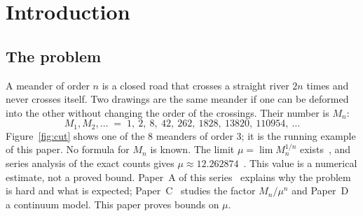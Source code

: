 \section{Introduction}\label{sec:intro}

\subsection{The problem}

A meander of order $n$ is a closed road that crosses a straight river $2n$ times and never crosses itself. Two drawings
are the same meander if one can be deformed into the other without changing the order of the crossings. Their number
is $M_n$:
\[ M_1, M_2, \ldots \;=\; 1,\ 2,\ 8,\ 42,\ 262,\ 1828,\ 13820,\ 110954,\ \ldots \]
Figure~\ref{fig:cut} shows one of the $8$ meanders of order $3$; it is the running example of this paper. No formula
for $M_n$ is known. The limit $\mu=\lim M_n^{1/n}$ exists~\cite{AP}, and series analysis of the exact counts gives
$\mu\approx 12.262874$~\cite{JG}. This value is a numerical estimate, not a proved bound. Paper~A of this series~\cite{PaperA} explains why the
problem is hard and what is expected; Paper~C~\cite{PaperC} studies the factor $M_n/\mu^n$ and Paper~D~\cite{PaperD}
a continuum model. This paper proves bounds on $\mu$.

